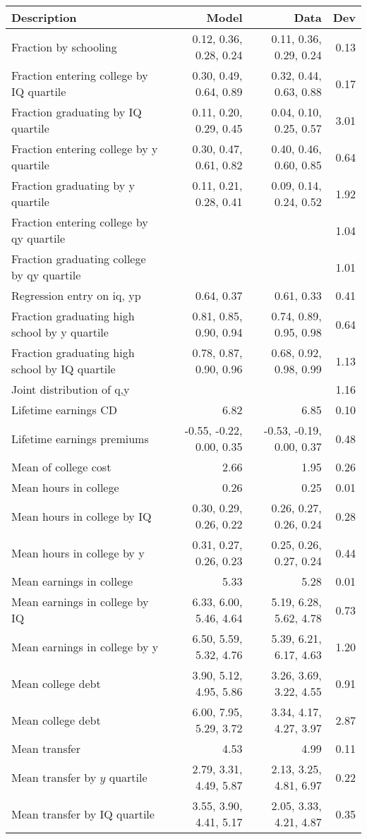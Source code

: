 \begin{tabular}{lrrr}
\hline
Description & Model  & Data  & Dev  \\ 
\hline
Fraction by schooling & 0.12, 0.36, 0.28, 0.24  & 0.11, 0.36, 0.29, 0.24  & 0.13  \\ 
Fraction entering college by IQ quartile & 0.30, 0.49, 0.64, 0.89  & 0.32, 0.44, 0.63, 0.88  & 0.17  \\ 
Fraction graduating by IQ quartile & 0.11, 0.20, 0.29, 0.45  & 0.04, 0.10, 0.25, 0.57  & 3.01  \\ 
Fraction entering college by y quartile & 0.30, 0.47, 0.61, 0.82  & 0.40, 0.46, 0.60, 0.85  & 0.64  \\ 
Fraction graduating by y quartile & 0.11, 0.21, 0.28, 0.41  & 0.09, 0.14, 0.24, 0.52  & 1.92  \\ 
Fraction entering college by qy quartile &   &   & 1.04  \\ 
Fraction graduating college by qy quartile &   &   & 1.01  \\ 
Regression entry on iq, yp & 0.64, 0.37  & 0.61, 0.33  & 0.41  \\ 
Fraction graduating high school by y quartile & 0.81, 0.85, 0.90, 0.94  & 0.74, 0.89, 0.95, 0.98  & 0.64  \\ 
Fraction graduating high school by IQ quartile & 0.78, 0.87, 0.90, 0.96  & 0.68, 0.92, 0.98, 0.99  & 1.13  \\ 
Joint distribution of q,y &   &   & 1.16  \\ 
Lifetime earnings CD & 6.82  & 6.85  & 0.10  \\ 
Lifetime earnings premiums & -0.55, -0.22, 0.00, 0.35  & -0.53, -0.19, 0.00, 0.37  & 0.48  \\ 
Mean of college cost & 2.66  & 1.95  & 0.26  \\ 
Mean hours in college & 0.26  & 0.25  & 0.01  \\ 
Mean hours in college by IQ & 0.30, 0.29, 0.26, 0.22  & 0.26, 0.27, 0.26, 0.24  & 0.28  \\ 
Mean hours in college by y & 0.31, 0.27, 0.26, 0.23  & 0.25, 0.26, 0.27, 0.24  & 0.44  \\ 
Mean earnings in college & 5.33  & 5.28  & 0.01  \\ 
Mean earnings in college by IQ & 6.33, 6.00, 5.46, 4.64  & 5.19, 6.28, 5.62, 4.78  & 0.73  \\ 
Mean earnings in college by y & 6.50, 5.59, 5.32, 4.76  & 5.39, 6.21, 6.17, 4.63  & 1.20  \\ 
Mean college debt & 3.90, 5.12, 4.95, 5.86  & 3.26, 3.69, 3.22, 4.55  & 0.91  \\ 
Mean college debt & 6.00, 7.95, 5.29, 3.72  & 3.34, 4.17, 4.27, 3.97  & 2.87  \\ 
Mean transfer & 4.53  & 4.99  & 0.11  \\ 
Mean transfer by $y$ quartile & 2.79, 3.31, 4.49, 5.87  & 2.13, 3.25, 4.81, 6.97  & 0.22  \\ 
Mean transfer by IQ quartile & 3.55, 3.90, 4.41, 5.17  & 2.05, 3.33, 4.21, 4.87  & 0.35  \\ 
\hline
\end{tabular}%
